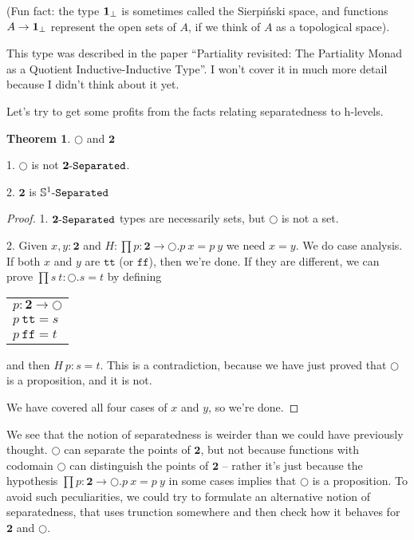 \documentclass[11pt]{article}
\theoremstyle{definition}
\newtheorem{theorem}{Theorem}[section]
\newcommand{\txt}[1]{\texttt{#1}}
\renewcommand{\(}{\left(}
\renewcommand{\)}{\right)}
\newcommand{\apl}[2]{#1\ #2}
\newcommand{\Unit}{\mathbf{1}}
\newcommand{\Bool}{\mathbf{2}}
\newcommand{\true}{\txt{tt}}
\newcommand{\false}{\txt{ff}}
\newcommand{\dprod}[2]{\prod #1.#2}
\begin{document}
(Fun fact: the type $\nonterm{\Unit}$ is sometimes called the Sierpiński space, and functions $A \to \nonterm{\Unit}$ represent the open sets of $A$, if we think of $A$ as a topological space).

This type was described in the paper ``Partiality revisited: The Partiality Monad as a Quotient Inductive-Inductive Type''. I won't cover it in much more detail because I didn't think about it yet.

Let's try to get some profits from the facts relating separatedness to h-levels.

\begin{theorem} $\Circle$ and $\Bool$

1. $\Circle$ is not $\Separated{\Bool}$.

2. $\Bool$ is $\Separated{\Circle}$
\end{theorem}
\begin{proof}

1. $\Separated{\Bool}$ types are necessarily sets, but $\Circle$ is not a set.

2. Given $x, y : \Bool$ and $H : \dprod{p : \Bool \to \Circle}{\apl{p}{x} = \apl{p}{y}}$ we need $x = y$. We do case analysis. If both $x$ and $y$ are $\true$ (or $\false$), then we're done. If they are different, we can prove $\dprod{s\ t : \Circle}{s = t}$ by defining \\

\begin{center}
\begin{tabular}{l}
$p : \Bool \to \Circle$ \\
$\apl{p}{\true} = s$ \\
$\apl{p}{\false} = t$
\end{tabular}
\end{center}

and then $\apl{H}{p} : s = t$. This is a contradiction, because we have just proved that $\Circle$ is a proposition, and it is not.

We have covered all four cases of $x$ and $y$, so we're done.

\end{proof}

We see that the notion of separatedness is weirder than we could have previously thought. $\Circle$ can separate the points of $\Bool$, but not because functions with codomain $\Circle$ can distinguish the points of $\Bool$ -- rather it's just because the hypothesis $\dprod{p : \Bool \to \Circle}{\apl{p}{x} = \apl{p}{y}}$ in some cases implies that $\Circle$ is a proposition. To avoid such peculiarities, we could try to formulate an alternative notion of separatedness, that uses trunction somewhere and then check how it behaves for $\Bool$ and $\Circle$.
\end{document}
